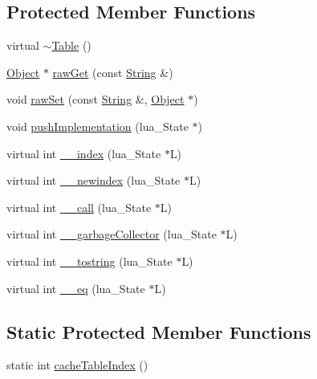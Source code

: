 \subsection*{Protected Member Functions}
\begin{DoxyCompactItemize}
\item 
virtual \hyperlink{classSLB_1_1Table_a949bbb655ae00da229f77232c0b7bce4}{$\sim$\+Table} ()
\item 
\hyperlink{classSLB_1_1Object}{Object} $\ast$ \hyperlink{classSLB_1_1Table_a914732ee6593aef4f0629c8c718f97e9}{raw\+Get} (const \hyperlink{namespaceSLB_a6a4c36e7004d99c0535c2c91c200c9a1}{String} \&)
\item 
void \hyperlink{classSLB_1_1Table_ad910663a91955a96a7e04e61cadced35}{raw\+Set} (const \hyperlink{namespaceSLB_a6a4c36e7004d99c0535c2c91c200c9a1}{String} \&, \hyperlink{classSLB_1_1Object}{Object} $\ast$)
\item 
void \hyperlink{classSLB_1_1Table_afcc07b67095621f623cdb0c18ae60743}{push\+Implementation} (lua\+\_\+\+State $\ast$)
\item 
virtual int \hyperlink{classSLB_1_1Table_a9d7d33989f4a6087e8db437dbb0d7e6f}{\+\_\+\+\_\+index} (lua\+\_\+\+State $\ast$L)
\item 
virtual int \hyperlink{classSLB_1_1Table_a591a737b21c091ddcc8b189031ac4d99}{\+\_\+\+\_\+newindex} (lua\+\_\+\+State $\ast$L)
\item 
virtual int \hyperlink{classSLB_1_1Table_a5bfae69bf2935ebfcf4e3a501e6aacb3}{\+\_\+\+\_\+call} (lua\+\_\+\+State $\ast$L)
\item 
virtual int \hyperlink{classSLB_1_1Table_ac71599fffec3209df55537c5caad57ff}{\+\_\+\+\_\+garbage\+Collector} (lua\+\_\+\+State $\ast$L)
\item 
virtual int \hyperlink{classSLB_1_1Table_ace332f5f18bd8dad6a62a5b6e0240eab}{\+\_\+\+\_\+tostring} (lua\+\_\+\+State $\ast$L)
\item 
virtual int \hyperlink{classSLB_1_1Table_ab5285befee70dfe8110b19bc72b3db7b}{\+\_\+\+\_\+eq} (lua\+\_\+\+State $\ast$L)
\end{DoxyCompactItemize}
\subsection*{Static Protected Member Functions}
\begin{DoxyCompactItemize}
\item 
static int \hyperlink{classSLB_1_1Table_a46c30e007a87de06a0ca7b915affd474}{cache\+Table\+Index} ()
\end{DoxyCompactItemize}
